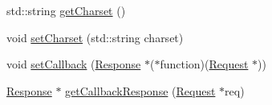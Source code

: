 \begin{DoxyCompactItemize}
\item 
std\-::string \hyperlink{classswift_1_1_hook_af530b678e3663ff565411a26ee6f1974}{get\-Charset} ()
\item 
void \hyperlink{classswift_1_1_hook_a1867ce0a20bf811620a9f7d598986ff8}{set\-Charset} (std\-::string charset)
\item 
void \hyperlink{classswift_1_1_hook_aa1fd10e80b74ee88885d3b7225cf0c90}{set\-Callback} (\hyperlink{classswift_1_1_response}{Response} $\ast$($\ast$function)(\hyperlink{classswift_1_1_request}{Request} $\ast$))
\item 
\hyperlink{classswift_1_1_response}{Response} $\ast$ \hyperlink{classswift_1_1_hook_af73ae15c10ee4c34bd35eca56e78951a}{get\-Callback\-Response} (\hyperlink{classswift_1_1_request}{Request} $\ast$req)
\end{DoxyCompactItemize}


